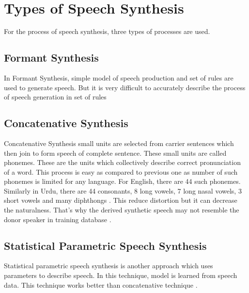 \section{Types of Speech Synthesis}
For the process of speech synthesis, three types of processes are used.

\subsection{Formant Synthesis}
In Formant Synthesis, simple model of speech production and set of rules are used to generate
speech. But it is very difficult to accurately describe the process of speech generation in set of
rules

\subsection{Concatenative Synthesis}
Concatenative Synthesis small units are selected from carrier sentences which then join to form
speech of complete sentence. These small units are called phonemes. These are the units which
collectively describe correct pronunciation of a word. This process is easy as compared to previous one
as number of such phonemes is limited for any language. For English, there are 44 such phonemes.
Similarly in Urdu, there are 44 consonants, 8 long vowels, 7 long nasal vowels, 3 short vowels and many
diphthongs \cite{saleem2002urdu}. This reduce distortion but it can decrease the naturalness.
That’s why the derived synthetic speech may not resemble the donor speaker in training database \cite{huang1996whistler}.

\subsection{Statistical Parametric Speech Synthesis}
Statistical parametric speech synthesis is another approach which uses parameters to describe
speech. In this technique, model is learned from speech data. This technique works better than
concatenative technique \cite{merritt2013investigating}. 

